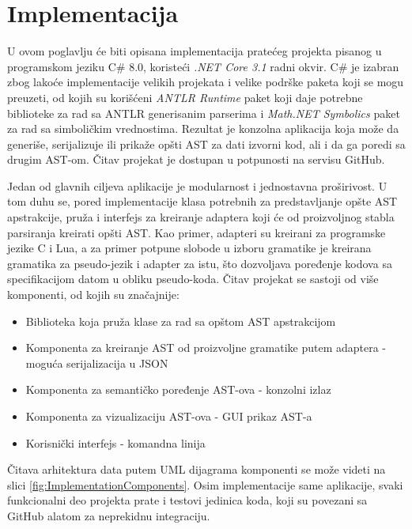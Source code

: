 \chapter{Implementacija}
\label{chp:Implementation}

U ovom poglavlju će biti opisana implementacija pratećeg projekta pisanog u programskom jeziku C\# 8.0, koristeći \emph{.NET Core 3.1} radni okvir. C\# je izabran zbog lakoće implementacije velikih projekata i velike podrške paketa koji se mogu preuzeti, od kojih su korišćeni \emph{ANTLR Runtime} paket koji daje potrebne biblioteke za rad sa ANTLR generisanim parserima i \emph{Math.NET Symbolics} paket za rad sa simboličkim vrednostima. Rezultat je konzolna aplikacija koja može da generiše, serijalizuje ili prikaže opšti AST za dati izvorni kod, ali i da ga poredi sa drugim AST-om. Čitav projekat je dostupan u potpunosti na servisu GitHub.

Jedan od glavnih ciljeva aplikacije je modularnost i jednostavna proširivost. U tom duhu se, pored implementacije klasa potrebnih za predstavljanje opšte AST apstrakcije, pruža i interfejs za kreiranje adaptera koji će od proizvoljnog stabla parsiranja kreirati opšti AST. Kao primer, adapteri su kreirani za programske jezike C i Lua, a za primer potpune slobode u izboru gramatike je kreirana gramatika za pseudo-jezik i adapter za istu, što dozvoljava poređenje kodova sa specifikacijom datom u obliku pseudo-koda. Čitav projekat se sastoji od više komponenti, od kojih su značajnije:
\begin{itemize}
    \item Biblioteka koja pruža klase za rad sa opštom AST apstrakcijom
    \item Komponenta za kreiranje AST od proizvoljne gramatike putem adaptera - moguća serijalizacija u JSON
    \item Komponenta za semantičko poređenje AST-ova - konzolni izlaz
    \item Komponenta za vizualizaciju AST-ova - GUI prikaz AST-a
    \item Korisnički interfejs - komandna linija
\end{itemize}

Čitava arhitektura data putem UML dijagrama komponenti se može videti na slici \ref{fig:ImplementationComponents}. Osim implementacije same aplikacije, svaki funkcionalni deo projekta prate i testovi jedinica koda, koji su povezani sa GitHub alatom za neprekidnu integraciju.

